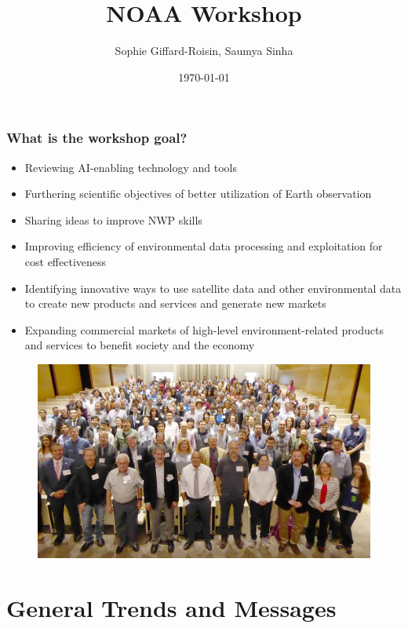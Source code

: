\documentclass{beamer}
\title[NOAA workshop (Washington DC): Leveraging AI in the exploitation of Satellite Earth Observations \& numerical weather prediction] %
{NOAA Workshop}
\author{Sophie Giffard-Roisin, Saumya Sinha}
\institute[CU] %
{
	
}
\date{\today} %
\begin{document}
\begin{frame}
\titlepage %
\end{frame}

\begin{frame}
\frametitle{What is the workshop goal?}
\begin{itemize}
\footnotesize
    \item Reviewing AI-enabling technology and tools
    \item Furthering scientific objectives of better utilization of Earth observation
    \item Sharing ideas to improve NWP skills
    \item Improving efficiency of environmental data processing and exploitation for cost effectiveness
    \item Identifying innovative ways to use satellite data and other environmental data to create new products and services and generate new markets
    \item Expanding commercial markets of high-level environment-related products and services to benefit society and the economy

\end{itemize}
\begin{figure}
	\includegraphics[width=0.45\linewidth]{figs/AIWkshp2019_grouppic_1000x582.jpg}
\end{figure}
\end{frame}


\section{General Trends and Messages}
\end{document}
